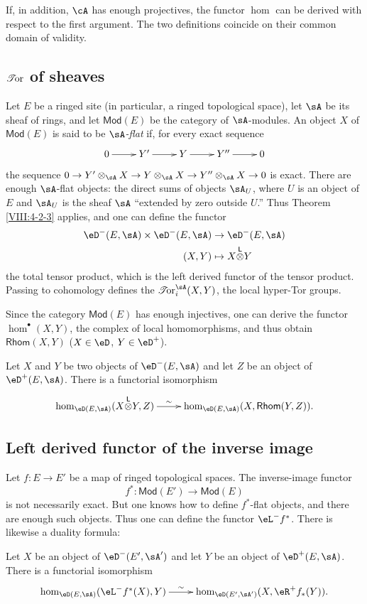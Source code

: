 If, in addition, $\cA$ has enough projectives, the functor $\hom$ can be
derived with respect to the first argument. The two definitions coincide
on their common domain of validity.

\subsection{\texorpdfstring{$\operatorname{\mathscr{T}\!or}$}{Tor} of sheaves}\label{VIII:6-2}

Let $E$ be a ringed site (in particular, a ringed topological space), let
$\sA$ be its sheaf of rings, and let $\mathsf{Mod}(E)$ be the category of
$\sA$-modules. An object $X$ of $\mathsf{Mod}(E)$ is said to be
\emph{$\sA$-flat} if, for every exact sequence
\[\xymatrix{
  0 \ar[r]
    & Y' \ar[r]
    & Y \ar[r]
    & Y'' \ar[r]
    & 0
}\]
the sequence
$0 \to Y'\otimes_\sA X \to Y\otimes_\sA X \to Y''\otimes_\sA X\to 0$
is exact. There are enough $\sA$-flat objects: the direct sums of objects
$\sA_U$, where $U$ is an object of $E$ and $\sA_U$ is the sheaf $\sA$
“extended by zero outside $U$.” Thus Theorem \ref{VIII:4-2-3} applies,
and one can define the functor
\begin{align*}
  \eD^-(E,\sA) \times \eD^-(E,\sA) &\to \eD^-(E,\sA) \\
  (X,Y) &\mapsto X\lotimes Y
\end{align*}
the total tensor product, which is the left derived functor of the tensor
product. Passing to cohomology defines the $\Tor_i^\sA(X,Y)$, the local
hyper-Tor groups.

Since the category $\mathsf{Mod}(E)$ has enough injectives, one can derive
the functor $\hom^\bullet(X,Y)$, the complex of local homomorphisms, and
thus obtain $\mathsf{Rhom}(X,Y)$ ($X\in \eD$, $Y\in \eD^+$).

Let $X$ and $Y$ be two objects of $\eD^-(E,\sA)$ and let $Z$ be an object
of $\eD^+(E,\sA)$. There is a functorial isomorphism
\[\xymatrix{
  \hom_{\eD(E,\sA)}(X\lotimes Y,Z) \ar[r]^-\sim
    &\hom_{\eD(E,\sA)}(X,\mathsf{Rhom}(Y,Z)) \text{.}
}\]

\subsection{Left derived functor of the inverse image}\label{VIII:6-3}

Let $f:E\to E'$ be a map of ringed topological spaces. The inverse-image
functor
\[
  f^\ast:\mathsf{Mod}(E') \to \mathsf{Mod}(E)
\]
is not necessarily exact. But one knows how to define $f^\ast$-flat
objects, and there are enough such objects. Thus one can define the
functor $\eL^- f^\ast$. There is likewise a duality formula:

Let $X$ be an object of $\eD^-(E',\sA')$ and let $Y$ be an object of
$\eD^+(E,\sA)$. There is a functorial isomorphism
\[\xymatrix{
  \hom_{\eD(E,\sA)}(\eL^- f^\ast(X),Y) \ar[r]^-\sim
    & \hom_{\eD(E',\sA')}(X,\eR^+ f_\ast(Y)) \text{.}
}\]
